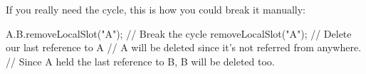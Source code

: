If you really need the cycle, this is how you could break it manually:

\begin{urbiunchecked}
A.B.removeLocalSlot("A"); // Break the cycle
removeLocalSlot("A"); // Delete our last reference to A
// A will be deleted since it's not referred from anywhere.
// Since A held the last reference to B, B will be deleted too.
\end{urbiunchecked}

